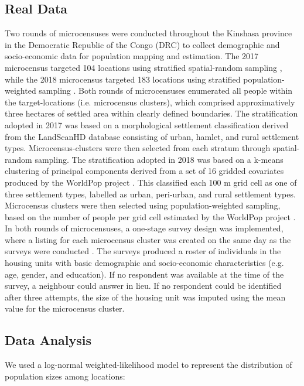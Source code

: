 \documentclass[9pt,twocolumn,twoside,lineno]{pnas-new}
\begin{document}
{	\subsection{Real Data}
	
	Two rounds of microcensuses were conducted throughout the Kinshasa province in the Democratic Republic of the Congo (DRC) to collect demographic and socio-economic data for population mapping and estimation. The 2017 microcensus targeted 104 locations using stratified spatial-random sampling \cite{}, while the 2018 microcensus targeted 183 locations using stratified population-weighted sampling \cite{}. Both rounds of microcensuses enumerated all people within the target-locations (i.e. microcensus clusters), which comprised approximatively three hectares of settled area within clearly defined boundaries. 
  The stratification adopted in 2017 was based on a morphological settlement classification derived from the LandScanHD database \cite{} consisting of urban, hamlet, and rural settlement types. Microcensus-clusters were then selected from each stratum through spatial-random sampling. The stratification adopted in 2018 was based on a k-means clustering of principal components derived from a set of 16 gridded covariates produced by the WorldPop project \cite{}. This classified each 100 m grid cell as one of three settlement types, labelled as urban, peri-urban, and rural settlement types. Microcensus clusters were then selected using population-weighted sampling, based on the number of people per grid cell estimated by the WorldPop project \cite{}.
  In both rounds of microcensuses, a one-stage survey design was implemented, where a listing for each microcensus cluster was created on the same day as the surveys were conducted \cite{}. The surveys produced a roster of individuals in the housing units with basic demographic and socio-economic characteristics (e.g. age, gender, and education). If no respondent was available at the time of the survey, a neighbour could answer in lieu. If no respondent could be identified after three attempts, the size of the housing unit was imputed using the mean value for the microcensus cluster. 
	
	\subsection{Data Analysis}
	
	We used a log-normal weighted-likelihood model to represent the distribution of population sizes among locations:
	
}
\end{document}
